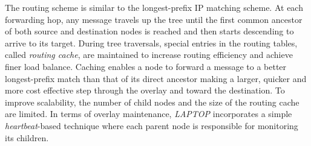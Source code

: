 The routing scheme is similar to the longest-prefix IP matching scheme. At each
forwarding hop, any message travels up the tree until the first common ancestor
of both source and destination nodes is reached and then starts descending to
arrive to its target. During tree traversals, special entries in the routing
tables, called \emph{routing cache}, are maintained to increase routing
efficiency and achieve finer load balance. Caching enables a node to forward a
message to a better longest-prefix match than that of its direct ancestor making
a larger, quicker and more cost effective step through the overlay and toward
the destination. To improve scalability, the number of child nodes and the
size of the routing cache are limited. In terms of overlay maintenance, \emph{LAPTOP}
incorporates a simple \emph{heartbeat}-based technique where each parent node is
responsible for monitoring its children.

%
%



